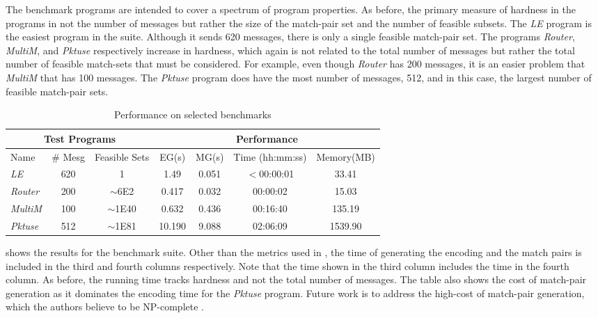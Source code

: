 The benchmark programs are intended to cover a spectrum of program
properties. As before, the primary measure of hardness in the programs
in not the number of messages but rather the size of the match-pair
set and the number of feasible subsets.  The \textit{LE} program is
the easiest program in the suite. Although it sends 620 messages,
there is only a single feasible match-pair set. The programs
\textit{Router}, \textit{MultiM}, and \textit{Pktuse} respectively
increase in hardness, which again is not related to the total number
of messages but rather the total number of feasible match-sets that
must be considered. For example, even though \textit{Router} has 200
messages, it is an easier problem that \textit{MultiM} that has 100
messages. The \textit{Pktuse} program does have the most number of
messages, 512, and in this case, the largest number of feasible
match-pair sets.

\begin{table}[h]
\begin{center}
\setlength{\tabcolsep}{2pt}
\scriptsize
\caption{Performance on selected benchmarks \label{table:second}}
\begin{tabular}{|l|c|c|c|c|c|c|}
		\hline
         \multicolumn{3}{|c|}{Test Programs} & \multicolumn{4}{|c|}{Performance} \\ \hline
         Name & \# Mesg & Feasible Sets & EG(s) & MG(s) & Time (hh:mm:ss) & Memory(MB) \\ \hline
         \textit{LE} & 620 & 1 & 1.49 & 0.051 & $<$00:00:01 & 33.41  \\ %
         \textit{Router} & 200 & $\sim$6E2 & 0.417 & 0.032 & 00:00:02 & 15.03  \\ %
         \textit{MultiM} & 100 & $\sim$1E40 & 0.632 & 0.436 &  00:16:40 & 135.19  \\ %
         \textit{Pktuse} & 512 & $\sim$1E81 & 10.190 & 9.088 & 02:06:09 & 1539.90 \\ %
         \hline
		\end{tabular}
\end{center}
\end{table}

 shows the results for the benchmark
suite. Other than the metrics used in , the time
of generating the encoding and the match pairs is included in the
third and fourth columns respectively. Note that the time shown in the
third column includes the time in the fourth column. As before, the
running time tracks hardness and not the total number of messages. The
table also shows the cost of match-pair generation as it dominates the
encoding time for the \textit{Pktuse} program. Future work is to
address the high-cost of match-pair generation, which the authors
believe to be NP-complete \cite{match-pair-np-complete}.

